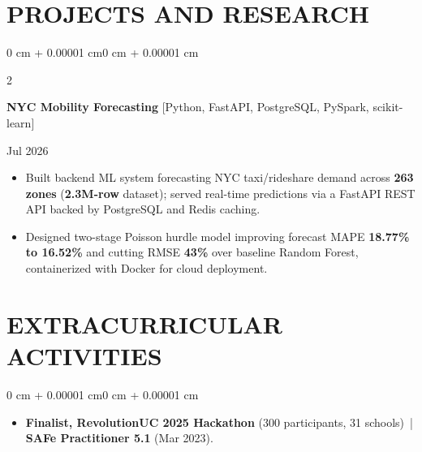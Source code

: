\documentclass[10pt, letterpaper]{article}
\newenvironment{highlights}{
    \begin{itemize}[
        topsep=0.10 cm,
        parsep=0.06 cm,
        partopsep=0pt,
        itemsep=0.06 cm,
        leftmargin=12pt
    ]
}{
    \end{itemize}
}
\newenvironment{onecolentry}{
    \begin{adjustwidth}{0 cm + 0.00001 cm}{0 cm + 0.00001 cm}
}{
    \end{adjustwidth}
}
\newenvironment{twocolentry}[2][]{
    \onecolentry
    \def\secondColumn{#2}
    \setcolumnwidth{\fill, 4.5 cm}
    \begin{paracol}{2}
}{
    \switchcolumn \raggedleft \secondColumn
    \end{paracol}
    \endonecolentry
}
\begin{document}
\section{PROJECTS AND RESEARCH}
\begin{twocolentry}{Jul 2026}
\textbf{NYC Mobility Forecasting} [Python, FastAPI, PostgreSQL, PySpark, scikit-learn]
\end{twocolentry}
\begin{highlights}
  \item Built backend ML system forecasting NYC taxi/rideshare demand across \textbf{263 zones} (\textbf{2.3M-row} dataset); served real-time predictions via a FastAPI REST API backed by PostgreSQL and Redis caching.
  \item Designed two-stage Poisson hurdle model improving forecast MAPE \textbf{18.77\% to 16.52\%} and cutting RMSE \textbf{43\%} over baseline Random Forest, containerized with Docker for cloud deployment.
\end{highlights}

\section{EXTRACURRICULAR ACTIVITIES}
\begin{onecolentry}
\begin{highlights}
  \item \textbf{Finalist, RevolutionUC 2025 Hackathon} (300 participants, 31 schools) \,|\, \textbf{SAFe Practitioner 5.1} (Mar 2023).
\end{highlights}
\end{onecolentry}
\end{document}

